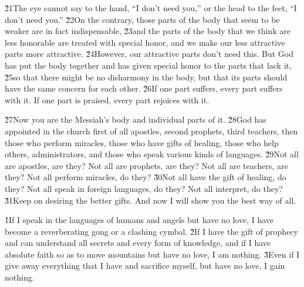 \v{21}The eye cannot say to the hand, ``I don't need you,'' or the head to the feet, ``I don't need you.'' \v{22}On the contrary, those parts of the body that seem to be weaker are in fact indispensable, \v{23}and the parts of the body that we think are less honorable are treated with special honor, and we make our less attractive parts more attractive. \v{24}However, our attractive parts don't need this. But God has put the body together and has given special honor to the parts that lack it, \v{25}so that there might be no disharmony in the body, but that its parts should have the same concern for each other. \v{26}If one part suffers, every part suffers with it. If one part is praised, every part rejoices with it.

\v{27}Now you are the Messiah's body and individual parts of it. \v{28}God has appointed in the church first of all apostles, second prophets, third teachers, then those who perform miracles, those who have gifts of healing, those who help others, administrators, and those who speak various kinds of languages. \v{29}Not all are apostles, are they? Not all are prophets, are they? Not all are teachers, are they? Not all perform miracles, do they? \v{30}Not all have the gift of healing, do they? Not all speak in foreign languages, do they? Not all interpret, do they? \v{31}Keep on desiring the better gifts. And now I will show you the best way of all.

\v{1}If I speak in the languages of humans and angels but have no love, I have become a reverberating gong or a clashing cymbal. \v{2}If I have the gift of prophecy and can understand all secrets and every form of knowledge, and if I have absolute faith so as to move mountains but have no love, I am nothing. \v{3}Even if I give away everything that I have and sacrifice myself, but have no love, I gain nothing.

